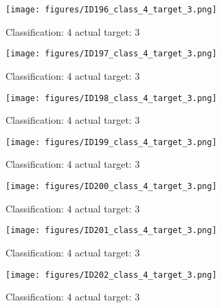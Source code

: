 \begin{figure}[h!]
\begin{center}
\texttt{[image: figures/ID196\_class\_4\_target\_3.png]}
\end{center}
\caption{ Classification: 4 actual target: 3}
\label{fig:ID196_class_4_target_3}
\end{figure}
\begin{figure}[h!]
\begin{center}
\texttt{[image: figures/ID197\_class\_4\_target\_3.png]}
\end{center}
\caption{ Classification: 4 actual target: 3}
\label{fig:ID197_class_4_target_3}
\end{figure}
\begin{figure}[h!]
\begin{center}
\texttt{[image: figures/ID198\_class\_4\_target\_3.png]}
\end{center}
\caption{ Classification: 4 actual target: 3}
\label{fig:ID198_class_4_target_3}
\end{figure}
\begin{figure}[h!]
\begin{center}
\texttt{[image: figures/ID199\_class\_4\_target\_3.png]}
\end{center}
\caption{ Classification: 4 actual target: 3}
\label{fig:ID199_class_4_target_3}
\end{figure}
\begin{figure}[h!]
\begin{center}
\texttt{[image: figures/ID200\_class\_4\_target\_3.png]}
\end{center}
\caption{ Classification: 4 actual target: 3}
\label{fig:ID200_class_4_target_3}
\end{figure}
\begin{figure}[h!]
\begin{center}
\texttt{[image: figures/ID201\_class\_4\_target\_3.png]}
\end{center}
\caption{ Classification: 4 actual target: 3}
\label{fig:ID201_class_4_target_3}
\end{figure}
\begin{figure}[h!]
\begin{center}
\texttt{[image: figures/ID202\_class\_4\_target\_3.png]}
\end{center}
\caption{ Classification: 4 actual target: 3}
\label{fig:ID202_class_4_target_3}
\end{figure}
